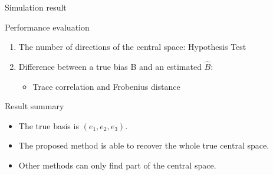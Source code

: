 \documentclass[ignorenonframetext,]{beamer}
\providecommand{\tightlist}{%
  \setlength{\itemsep}{0pt}\setlength{\parskip}{0pt}}
\begin{document}
\begin{frame}{Simulation result}

\begin{block}{Performance evaluation}

\begin{enumerate}
\def\labelenumi{\arabic{enumi}.}
\tightlist
\item
  The number of directions of the central space: Hypothesis Test\\
\item
  Difference between a true bias B and an estimated \(\hat{B}\):

  \begin{itemize}
  \tightlist
  \item
    Trace correlation and Frobenius distance
  \end{itemize}
\end{enumerate}

\end{block}

\begin{block}{Result summary}

\begin{itemize}
\tightlist
\item
  The true basis is \((e_1,e_2, e_3)\).\\
\item
  The proposed method is able to recover the whole true central space.
\item
  Other methods can only find part of the central space.
\end{itemize}

\end{block}

\end{frame}
\end{document}
